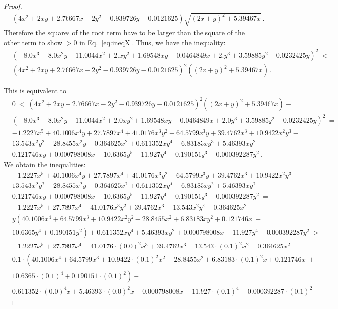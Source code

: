 \documentclass{article}
\begin{document}
\begin{proof}
\begin{align}
&\left(4 x^2+2 x y+2.76667 x-2 y^2-0.939726 y-0.0121625\right) \sqrt{(2 x+y)^2+5.39467 x} \ . 
\end{align}
Therefore the squares of the root term have to be larger 
than the square of the other term to show $>0$ in 
Eq.~\eqref{eq:ineqX}.
Thus, we have the inequality:
\begin{align}
&\left(-8.0 x^3-8.0 x^2 y-11.0044 x^2+2. x y^2+1.69548 x y-0.0464849 x+2. y^3+3.59885 y^2-0.0232425 y\right)^2\ < \\ \nonumber 
&\left(4 x^2+2 x y+2.76667 x-2 y^2-0.939726 y-0.0121625\right)^2 \left((2 x+y)^2+5.39467 x\right) \ . 
\end{align}

This is equivalent to
\begin{align}
& 0\ < \ \left(4 x^2+2 x y+2.76667 x-2 y^2-0.939726 y-0.0121625\right)^2 \left((2 x+y)^2+5.39467 x\right)-\\ \nonumber 
&\left(-8.0 x^3-8.0 x^2 y-11.0044 x^2+2.0 x y^2+1.69548 x y-0.0464849 x+2.0 y^3+3.59885 y^2-0.0232425 y\right)^2\ = \\ \nonumber &-1.2227 x^5+40.1006 x^4 y+27.7897 x^4+41.0176 x^3 y^2+64.5799 x^3 y+39.4762 x^3+10.9422 x^2 y^3-\\ \nonumber &13.543 x^2 y^2-28.8455 x^2 y-0.364625 x^2+0.611352 x y^4+6.83183 x y^3+5.46393 x y^2+\\ \nonumber &0.121746 x y+0.000798008 x-10.6365 y^5-11.927 y^4+0.190151 y^3-0.000392287 y^2 \ .
\end{align}
We obtain the inequalities: 
\begin{align}
&-1.2227 x^5+40.1006 x^4 y+27.7897 x^4+41.0176 x^3 y^2+64.5799 x^3 y+39.4762 x^3+10.9422 x^2 y^3-\\ \nonumber &13.543 x^2 y^2-28.8455 x^2 y-0.364625 x^2+0.611352 x y^4+6.83183 x y^3+5.46393 x y^2+\\ \nonumber &0.121746 x y+0.000798008 x-10.6365 y^5-11.927 y^4+0.190151 y^3-0.000392287 y^2\ = \\ \nonumber &-1.2227 x^5+27.7897 x^4+41.0176 x^3 y^2+39.4762 x^3-13.543 x^2 y^2-0.364625 x^2+\\ \nonumber &y \left(40.1006 x^4+64.5799 x^3+10.9422 x^2 y^2-28.8455 x^2+6.83183 x y^2+0.121746 x\ - \right. \\ \nonumber &\left. 10.6365 y^4+0.190151 y^2\right)+0.611352 x y^4+5.46393 x y^2+0.000798008 x-11.927 y^4-0.000392287 y^2\ > \\ \nonumber &
-1.2227 x^5+27.7897 x^4+41.0176 \cdot (0.0)^2 x^3+39.4762 x^3-13.543 \cdot (0.1)^2 x^2-0.364625 x^2- \\ \nonumber &0.1 \cdot  \left(40.1006 x^4+64.5799 x^3+10.9422 \cdot (0.1)^2 x^2-28.8455 x^2+6.83183 \cdot (0.1)^2 x+0.121746 x\ + \right. \\ \nonumber &\left. 10.6365 \cdot (0.1)^4+0.190151 \cdot (0.1)^2\right)+\\ \nonumber &0.611352 \cdot (0.0)^4 x+5.46393 \cdot (0.0)^2 x+0.000798008 x-11.927 \cdot (0.1)^4-0.000392287 \cdot (0.1)^2

\end{align}
\end{proof}
\end{document}
